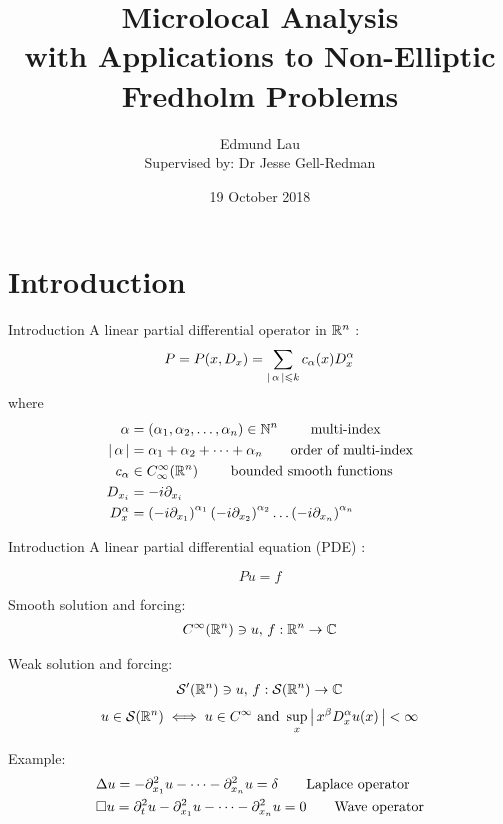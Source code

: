 \documentclass{beamer}
\title{Microlocal Analysis \\ 
    \large with Applications to Non-Elliptic Fredholm Problems}
\author{Edmund Lau \\
Supervised by: Dr Jesse Gell-Redman}
\institute[Unimelb] {
    The University of Melbourne \\ %
    \medskip
    \textit{elau1@student.unimelb.edu.au} %
}
\date{19 October 2018}
\begin{document}
    
\begin{frame}
\titlepage 
\end{frame}






\section{Introduction} 
\begin{frame}{Introduction}
A linear partial differential operator in ${\mathbb R}^n$ : 
\begin{equation}
P = P(x, D_x) = \sum_{\left|\, \alpha\,\right| \leqslant k} c_\alpha(x) D^\alpha_x 
\end{equation}
\pause
where 
\begin{align*}
\alpha &= (\alpha_1, \alpha_2, \dots, \alpha_n) \in {\ensuremath {\mathbb N}}^n \tag*{ multi-index } \\
\left|\, \alpha\,\right| &= \alpha_1 + \alpha_2 + \dots + \alpha_n \tag*{order of multi-index} \\
c_\alpha &\in C^\infty_\infty({\mathbb R}^n) \tag*{ bounded  smooth functions} \\
D_{x_i} &= -i \partial_{x_i} \\
D_x^\alpha & = \left(-i \partial_{x_1}\right)^{\alpha_1}\left(-i \partial_{x_2}\right)^{\alpha_2} \dots \left(-i \partial_{x_n}\right)^{\alpha_n} 
\end{align*}
\end{frame} 


\begin{frame}{Introduction}
A linear partial differential equation (PDE) : 

\begin{equation}
P u = f
\end{equation}

Smooth solution and forcing: 
\begin{align*}
C^\infty({\mathbb R}^n) \ni u, \, f : {\mathbb R}^n \to {\ensuremath {\mathbb C}} 
\end{align*}

Weak solution and forcing: 
\begin{align*}
\mathcal{S}'({\mathbb R}^n) \ni u, \, f : \mathcal{S}({\mathbb R}^n) \to {\ensuremath {\mathbb C}} 
\end{align*}
\begin{align*}
u \in \mathcal{S}({\mathbb R}^n)  \iff 
 u \in C^\infty \text{ and }  \sup_{x} \left|\, x^\beta D^\alpha_x u(x)\,\right| < \infty 
\end{align*}


Example: 
\begin{align*}
&\Delta u = - \partial_{x_1}^2 u - \dots - \partial_{x_n}^2 u  = \delta \tag*{Laplace operator} \\
&\Box u = \partial_{t}^2 u - \partial_{x_1}^2 u - \dots - \partial_{x_n}^2 u  = 0 \tag*{Wave operator} 
\end{align*}

\end{frame} 
\end{document}
